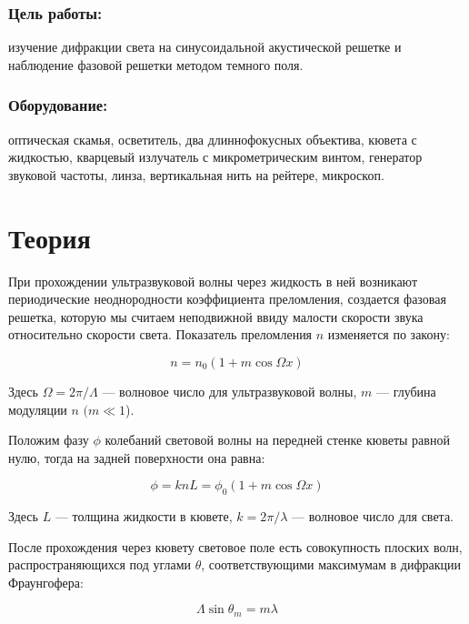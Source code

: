 \documentclass[a4paper,12pt]{article}
\begin{document}
\subsubsection*{Цель работы:} изучение дифракции света на синусоидальной акустической решетке и
наблюдение фазовой решетки методом темного поля.

\subsubsection*{Оборудование:} оптическая скамья, осветитель, два длиннофокусных объектива, кювета с жидкостью, кварцевый излучатель с микрометрическим винтом, генератор звуковой частоты, линза, вертикальная нить на рейтере, микроскоп.

\section*{Теория}

При прохождении ультразвуковой волны через жидкость в ней возникают периодические неоднородности коэффициента преломления, создается фазовая решетка, которую мы считаем неподвижной ввиду малости скорости звука относительно скорости света. Показатель
преломления $n$ изменяется по закону:

\begin{equation}\label{}
n = n_0 (1 + m \cos \Omega x)
\end{equation}

Здесь $ \Omega = 2 \pi / \Lambda $ --- волновое число для ультразвуковой волны, $ m $ --- глубина модуляции $ n $ $ (m \ll 1 $).

Положим фазу $ \phi $ колебаний световой волны на передней стенке кюветы равной нулю, тогда на задней поверхности она равна:

\begin{equation}\label{}
\phi  = k n L = \phi_0 (1 + m \cos \Omega x)
\end{equation}

Здесь $ L $ --- толщина жидкости в кювете, $ k = 2 \pi / \lambda $ --- волновое число для света.

После прохождения через кювету световое поле есть совокупность плоских волн, распространяющихся под углами $ \theta $, соответствующими максимумам в дифракции Фраунгофера:

\begin{equation}\label{eq:1}	
\Lambda \sin \theta_m = m \lambda
\end{equation}
\end{document}
